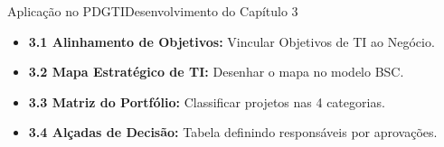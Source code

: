 \begin{senaiframe}{Aplicação no PDGTI}{Desenvolvimento do Capítulo 3}
  \vspace{0.2cm}
  \begin{tcolorbox}[senaigreencard, title={Capítulo 3 – Objetivos Estratégicos \& Mapa Estratégico}]
    \begin{itemize}
      \item \textbf{3.1 Alinhamento de Objetivos:} Vincular Objetivos de TI ao Negócio.
      \item \textbf{3.2 Mapa Estratégico de TI:} Desenhar o mapa no modelo BSC.
      \item \textbf{3.3 Matriz do Portfólio:} Classificar projetos nas 4 categorias.
      \item \textbf{3.4 Alçadas de Decisão:} Tabela definindo responsáveis por aprovações.
    \end{itemize}
  \end{tcolorbox}
\end{senaiframe}
